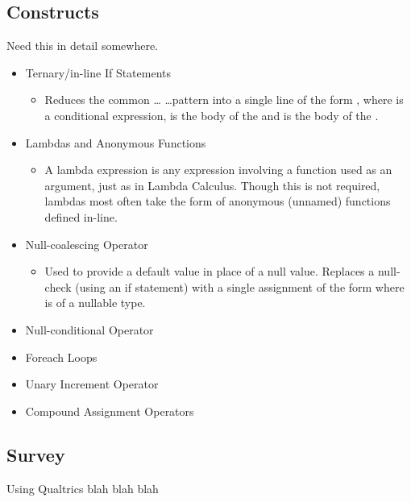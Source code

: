 \documentclass{article}
\begin{document}
    \subsection{Constructs}
    \label{subsec:constructs}
    Need this in detail somewhere.
    \begin{itemize}
        \item Ternary/in-line If Statements
            \begin{itemize}
                \item Reduces the common  \dots {} \dots pattern into a single line of the form , where  is a conditional expression,  is the body of the  and  is the body of the .
            \end{itemize}
        \item Lambdas and Anonymous Functions
            \begin{itemize}
                \item A lambda expression is any expression involving a function used as an argument, just as in Lambda Calculus. Though this is not required, lambdas most often take the form of anonymous (unnamed) functions defined in-line. \citep{javaLambdas}
            \end{itemize}
        \item Null-coalescing Operator
            \begin{itemize}
                \item Used to provide a default value in place of a null value. Replaces a null-check (using an if statement) with a single assignment of the form \newline{} where  is of a nullable type. \citep{gunnerson2012programmer}
            \end{itemize}
        \item Null-conditional Operator
         \item Foreach Loops
        \item Unary Increment Operator
        \item Compound Assignment Operators
    \end{itemize}

    \subsection{Survey}
        Using Qualtrics blah blah blah
\end{document}

